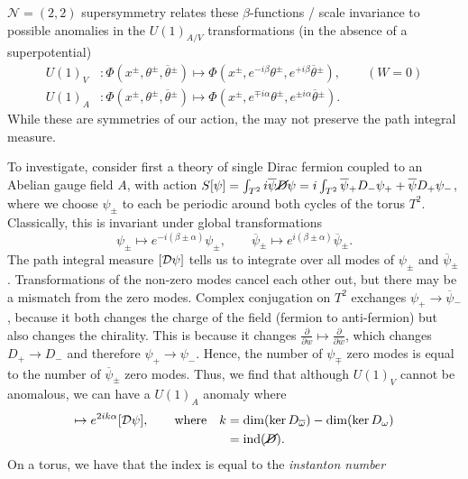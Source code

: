 $\mathcal{N} = (2,2)$ supersymmetry relates these $\beta$-functions / scale invariance to possible anomalies in the $U(1)_{A / V}$ transformations (in the absence of a superpotential)
\begin{align}
  U(1)_V &\colon \Phi(x^{\pm}, \theta^{\pm}, \overline{\theta}{}^{\pm}) \mapsto \Phi(x^{\pm}, e^{-i \beta} \theta^{\pm}, e^{+ i \beta} \overline{\theta}{}^{\pm}), \qquad (W = 0) \\
  U(1)_A &\colon \Phi(x^{\pm}, \theta^{\pm}, \overline{\theta}{}^{\pm}) \mapsto \Phi(x^{\pm}, e^{\mp i \alpha} \theta^{\pm}, e^{\pm i \alpha} \overline{\theta}{}^{\pm}).
\end{align}
While these are symmetries of our action, the may not preserve the path integral measure.

To investigate, consider first a theory of single Dirac fermion coupled to an Abelian gauge field $A$, with action $S[\psi] = \int_{T^2} i \overline{\psi}{} \cancel{D} \psi = i \int_{T^2} \overline{\psi}{}_+ D_- \psi_+ + \overline{\psi}{} D_+ \psi_-$, where we choose $\psi_{\pm}$ to each be periodic around both cycles of the torus $T^2$.
Classically, this is invariant under global transformations 
\begin{equation}
  \psi_{\pm} \mapsto e^{-i (\beta \pm \alpha)} \psi_{\pm}, \qquad \overline{\psi}{}_{\pm} \mapsto e^{i (\beta \pm \alpha)} \overline{\psi}{}_{\pm}.
\end{equation}
The path integral measure $[\mathop{\mathcal{D} \psi}]$ tells us to integrate over all modes of $\psi_{\pm}$ and $\overline{\psi}{}_{\pm}$. Transformations of the non-zero modes cancel each other out, but there may be a mismatch from the zero modes.
Complex conjugation on $T^2$ exchanges $\psi_+ \to \overline{\psi}{}_-$, because it both changes the charge of the field (fermion to anti-fermion) but also changes the chirality.
This is because it changes $ \frac{\partial }{\partial w} \mapsto \frac{\partial }{\partial \overline{w}{}}$, which changes $D_+ \to D_-$ and therefore $\psi_+ \to \psi_-$.
Hence, the number of $\psi_\mp$ zero modes is equal to the number of $\overline{\psi}{}_\pm$ zero modes.
Thus, we find that although $U(1)_V$ cannot be anomalous, we can have a $U(1)_A$ anomaly where
\begin{align}
  [\pdd{\psi}] \mapsto e^{2 i k \alpha} [\pdd{\psi}], \qquad \text{where} \quad k &= \dim(\ker D_{\overline{\omega}{}}) - \dim (\ker D_\omega) \\
										  &= \text{ind}(\cancel{D}).
\end{align}
On a torus, we have that the index is equal to the \emph{instanton number}
